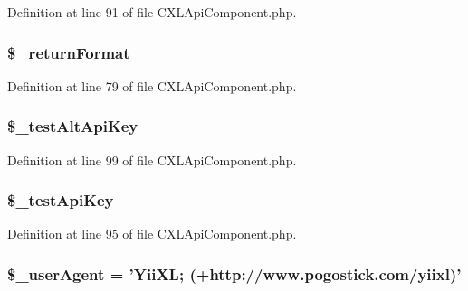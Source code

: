 Definition at line 91 of file CXLApiComponent.php.

\hypertarget{classCXLApiComponent_a7ea52a3850e51717b6268b7b9e468684}{
\subsubsection[{\$\_\-returnFormat}]{\setlength{\rightskip}{0pt plus 5cm}\$\_\-returnFormat}}
\label{classCXLApiComponent_a7ea52a3850e51717b6268b7b9e468684}


Definition at line 79 of file CXLApiComponent.php.

\hypertarget{classCXLApiComponent_a043b72271c216d07a270d5b57a17fe59}{
\subsubsection[{\$\_\-testAltApiKey}]{\setlength{\rightskip}{0pt plus 5cm}\$\_\-testAltApiKey}}
\label{classCXLApiComponent_a043b72271c216d07a270d5b57a17fe59}


Definition at line 99 of file CXLApiComponent.php.

\hypertarget{classCXLApiComponent_a539fd69c22d2f9c368e410d3542cd5a6}{
\subsubsection[{\$\_\-testApiKey}]{\setlength{\rightskip}{0pt plus 5cm}\$\_\-testApiKey}}
\label{classCXLApiComponent_a539fd69c22d2f9c368e410d3542cd5a6}


Definition at line 95 of file CXLApiComponent.php.

\hypertarget{classCXLApiComponent_a901ed68c5b7f6b758cc90b00197ca88b}{
\subsubsection[{\$\_\-userAgent}]{\setlength{\rightskip}{0pt plus 5cm}\$\_\-userAgent = '{\bf YiiXL}; (+http://www.pogostick.com/yiixl)'}}
\label{classCXLApiComponent_a901ed68c5b7f6b758cc90b00197ca88b}


